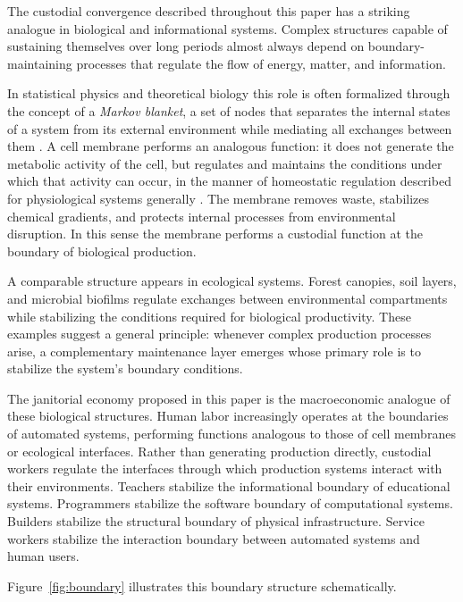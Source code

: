 \documentclass[12pt,a4paper]{article}
\theoremstyle{plain}
\theoremstyle{definition}
\theoremstyle{remark}
\begin{document}
The custodial convergence described throughout this paper has a striking
analogue in biological and informational systems.  Complex structures capable
of sustaining themselves over long periods almost always depend on
boundary-maintaining processes that regulate the flow of energy, matter, and
information.

In statistical physics and theoretical biology this role is often formalized
through the concept of a \emph{Markov blanket}, a set of nodes that separates
the internal states of a system from its external environment while mediating
all exchanges between them \cite{friston2019}.  A cell membrane performs an analogous function:
it does not generate the metabolic activity of the cell, but regulates and
maintains the conditions under which that activity can occur, in the manner
of homeostatic regulation described for physiological systems generally
\cite{cannon1932,ashby1952}.  The membrane
removes waste, stabilizes chemical gradients, and protects internal processes
from environmental disruption.  In this sense the membrane performs a
custodial function at the boundary of biological production.

A comparable structure appears in ecological systems.  Forest canopies, soil
layers, and microbial biofilms regulate exchanges between environmental
compartments while stabilizing the conditions required for biological
productivity.  These examples suggest a general principle: whenever complex
production processes arise, a complementary maintenance layer emerges whose
primary role is to stabilize the system's boundary conditions.

The janitorial economy proposed in this paper is the macroeconomic analogue
of these biological structures.  Human labor increasingly operates at the
boundaries of automated systems, performing functions analogous to those of
cell membranes or ecological interfaces.  Rather than generating production
directly, custodial workers regulate the interfaces through which production
systems interact with their environments.  Teachers stabilize the
informational boundary of educational systems.  Programmers stabilize the
software boundary of computational systems.  Builders stabilize the
structural boundary of physical infrastructure.  Service workers stabilize
the interaction boundary between automated systems and human users.

Figure~\ref{fig:boundary} illustrates this boundary structure schematically.
\end{document}
